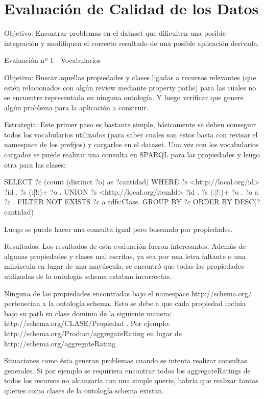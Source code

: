 \chapter{Evaluación de Calidad de los Datos}
\label{chapter:evaluacion}

Objetivo:
Encontrar problemas en el dataset que dificulten una posible integración y modifiquen el correcto resultado de una posible aplicación derivada.

Evaluación nº 1 - Vocabularios

Objetivo:
Buscar aquellas propiedades y clases ligadas a recursos relevantes (que estén relacionados con algún review mediante property paths) 
para las cuales no se encuentre representada en ninguna ontología. Y luego verificar que genere algún problema para la aplicación a construir.

Estrategia:
Este primer paso es bastante simple, básicamente se deben conseguir todos los vocabularios utilizados (para saber cuales son estos basta con revisar el namespace 
de los prefijos) y cargarlos en el dataset.
Una vez con los vocabularios cargados se puede realizar una consulta en SPARQL para las propiedades y leugo otra para las clases:

SELECT ?c (count (distinct ?o) as ?cantidad)
WHERE{
{
?s <http://local.org/id> ?id .
?s (:|!:)+ ?o .
}UNION{
?s <http://local.org/itemId> ?id .
?s (:|!:)+ ?o .
}
?o a ?c .
FILTER NOT EXISTS{
?c a rdfs:Class.
}
}GROUP BY ?c ORDER BY DESC(?cantidad)

Luego se puede hacer una consulta igual pero buscando por propiedades.

Resultados:
Los resultados de esta evaluación fueron interesantes. Además de algunas propiedades y clases mal escritas, ya sea por una letra faltante o una minúscula en lugar 
de una mayúscula, se encontró que todas las propiedades utilizadas de la ontología schema estaban incorrectas.

Ninguna de las propiedades encontradas bajo el namespace http://schema.org/ pertenecían a la ontología schema.
Esto se debe a que cada propiedad incluía bajo su path su clase dominio de la siguiente manera: http://schema.org/CLASE/Propiedad .
Por ejemplo:
http://schema.org/Product/aggregateRating en lugar de http://schema.org/aggregateRating

Situaciones como ésta generan problemas cuando se intenta realizar consultas generales. Si por ejemplo se requiriera encontrar todos los aggregateRatings de todos los recursos no alcanzaría con 
una simple querie, habría que realizar tantas queries como clases de la ontología schema existan.

